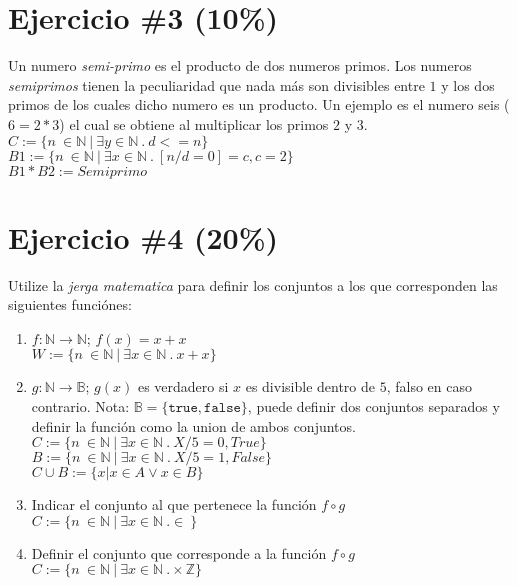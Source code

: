 \documentclass[10pt,a4paper]{article}
\begin{document}
\section*{Ejercicio \#3 (10\%)}
 Un numero \emph{semi-primo} es el producto de dos numeros primos. Los numeros
\emph{semiprimos} tienen la peculiaridad que nada m\'as son divisibles
entre $1$ y los dos primos de los cuales dicho numero es un producto. Un ejemplo
es el numero seis ($6=2*3$) el cual se obtiene al multiplicar los primos $2$ y $3$.
\\
     $C:=\{n\ \in \mathbb{N}\ |\ \exists y \in \mathbb{N}\ .\ d<= n\}$\\
        $B1:=\{n\ \in \mathbb{N}\ |\ \exists x \in \mathbb{N}\ .\ [n / d = 0 ]=c , c=2 \}$\\
                $B1*B2:=Semi primo$

\section*{Ejercicio \#4 (20\%)}
Utilize la \emph{jerga matematica} para definir los conjuntos a los que corresponden las
siguientes funci\'ones:
\begin{enumerate}
        \item{$f:\mathbb{N}\rightarrow\mathbb{N}$; $f(x)=x+x$} \\
                 $W:=\{n\ \in \mathbb{N}\ |\ \exists x \in \mathbb{N}\ .\ x + x  \}$\\
        \item{$g:\mathbb{N}\rightarrow\mathbb{B}$; $g(x)$ es verdadero si
        $x$ es divisible dentro de $5$, falso en caso contrario. Nota: $\mathbb{B}=
        \{\mathtt{true},\mathtt{false}\}$, puede definir dos conjuntos separados y
        definir la funci\'on como la union de ambos conjuntos.} \\
         $C:=\{n\ \in \mathbb{N}\ |\ \exists x \in \mathbb{N}\ .\ X/5=0,True \}$\\
         $B:=\{n\ \in \mathbb{N}\ |\ \exists x \in \mathbb{N}\ .\ X/5=1,False \}$\\
        $C\cup B:=\{x|x\in A\vee x\in B\}$
        \item{Indicar el conjunto al que pertenece la funci\'on $f\circ g$}\\
         $C:=\{n\ \in \mathbb{N}\ |\ \exists x \in \mathbb{N}\ .\in\ \}$\\
        \item{Definir el conjunto que corresponde a la funci\'on $f\circ g$}\\
        $C:=\{n\ \in \mathbb{N}\ |\ \exists x \in \mathbb{N}\ .\times\mathbb{Z} \}$\\

\end{enumerate}
\end{document}
